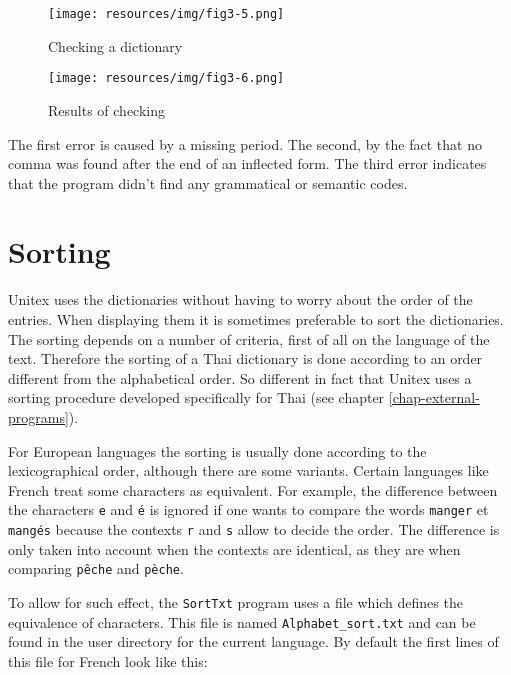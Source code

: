 \begin{figure}[!ht]
\begin{center}
\texttt{[image: resources/img/fig3-5.png]}
\caption{Checking a dictionary\label{fig-dictionary-checking}}
\end{center}
\end{figure}

\begin{figure}[!p]
\begin{center}
\texttt{[image: resources/img/fig3-6.png]}
\caption{Results of checking\label{fig-dictionary-checking-results}}
\end{center}
\end{figure}

\bigskip
\noindent The first error is caused by a missing period. The second, by the fact
that no comma was found after the end of an inflected form. The third error indicates
that the program didn't find any grammatical or semantic codes.


\section{Sorting}

Unitex uses the dictionaries without having to worry about the order of the
entries. When displaying them it is sometimes preferable to sort the
dictionaries. The sorting depends on a number of criteria, first of all on the
language of the text. Therefore the sorting of a Thai dictionary is done
according to an order different from the alphabetical order.  So different in
fact that Unitex uses a sorting procedure developed specifically for Thai (see
chapter \ref{chap-external-programs}).

\bigskip
\noindent For European languages the sorting is usually done according to the
lexicographical order, although there are some variants. Certain languages like
French treat some characters as equivalent. For example, the difference between
the characters  \verb+e+  and \texttt{\'e}  is ignored if one wants to compare
the words \verb+manger+ et \texttt{mang\'es} because the contexts
\verb+r+ and \verb+s+ allow to decide the order. The difference is only taken 
into account when the contexts are
identical, as they are when comparing \texttt{p\^eche} and
\texttt{p\`eche}.

\bigskip {}
\noindent
To allow for such effect, the \verb+SortTxt+ program  
 uses a file which
defines the equivalence of characters.   This file
is named \verb+Alphabet_sort.txt+  and can
be found in the user directory for the current language. By default the first
lines of this file for French look like this:

